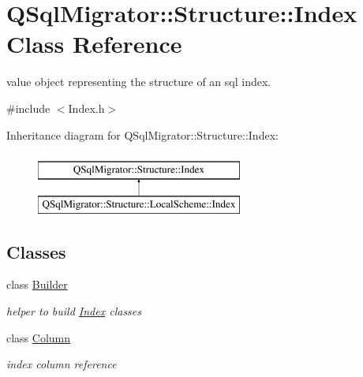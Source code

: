 \hypertarget{class_q_sql_migrator_1_1_structure_1_1_index}{}\section{Q\+Sql\+Migrator\+:\+:Structure\+:\+:Index Class Reference}
\label{class_q_sql_migrator_1_1_structure_1_1_index}


value object representing the structure of an sql index.  




{\ttfamily \#include $<$Index.\+h$>$}

Inheritance diagram for Q\+Sql\+Migrator\+:\+:Structure\+:\+:Index\+:\begin{figure}[H]
\begin{center}
\leavevmode
\includegraphics[height=2.000000cm]{class_q_sql_migrator_1_1_structure_1_1_index}
\end{center}
\end{figure}
\subsection*{Classes}
\begin{DoxyCompactItemize}
\item 
class \hyperlink{class_q_sql_migrator_1_1_structure_1_1_index_1_1_builder}{Builder}
\begin{DoxyCompactList}\small\item\em helper to build \hyperlink{class_q_sql_migrator_1_1_structure_1_1_index}{Index} classes \end{DoxyCompactList}\item 
class \hyperlink{class_q_sql_migrator_1_1_structure_1_1_index_1_1_column}{Column}
\begin{DoxyCompactList}\small\item\em index column reference \end{DoxyCompactList}\end{DoxyCompactItemize}
